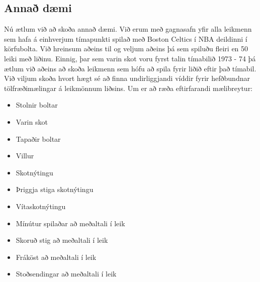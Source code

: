 \documentclass[]{book}
\providecommand{\tightlist}{%
  \setlength{\itemsep}{0pt}\setlength{\parskip}{0pt}}
\begin{document}
\hypertarget{annauxf0-duxe6mi}{%
\subsection{Annað dæmi}\label{annauxf0-duxe6mi}}

Nú ætlum við að skoða annað dæmi. Við erum með gagnasafn yfir alla leikmenn sem hafa á einhverjum tímapunkti spilað með Boston Celtics í NBA deildinni í körfubolta. Við hreinsum aðeins til og veljum aðeins þá sem spiluðu fleiri en 50 leiki með liðinu. Einnig, þar sem varin skot voru fyrst talin tímabilið 1973 - 74 þá ætlum við aðeins að skoða leikmenn sem hófu að spila fyrir liðið eftir það tímabil. Við viljum skoða hvort hægt sé að finna undirliggjandi víddir fyrir hefðbundnar tölfræðimælingar á leikmönnum liðsins. Um er að ræða eftirfarandi mælibreytur:

\begin{itemize}
\tightlist
\item
  Stolnir boltar
\item
  Varin skot
\item
  Tapaðir boltar
\item
  Villur
\item
  Skotnýtingu
\item
  Þriggja stiga skotnýtingu
\item
  Vítaskotnýtingu
\item
  Mínútur spilaðar að meðaltali í leik
\item
  Skoruð stig að meðaltali í leik
\item
  Fráköst að meðaltali í leik
\item
  Stoðsendingar að meðaltali í leik
\end{itemize}
\end{document}
